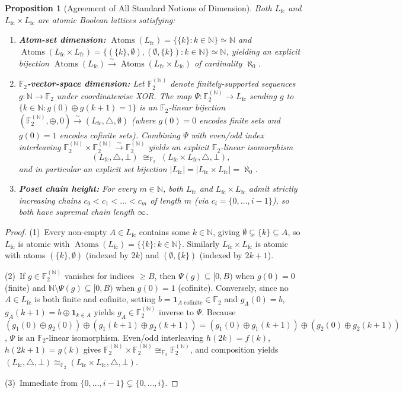 \documentclass[11pt]{article}
\newtheorem{proposition}[theorem]{Proposition}
\theoremstyle{definition}
\theoremstyle{remark}
\newcommand{\Atoms}{\operatorname{Atoms}}
\newcommand{\Ftwo}{\mathbb{F}_2}
\newcommand{\N}{\mathbb{N}}
\newcommand{\Lfc}{L_{\mathrm{fc}}}
\begin{document}
\begin{proposition}[Agreement of All Standard Notions of Dimension]
\label{prop:same-dim}
Both $\Lfc$ and $\Lfc \times \Lfc$ are atomic Boolean lattices satisfying:
\begin{enumerate}
  \item \textbf{Atom-set dimension:} $\Atoms(\Lfc) = \{\{k\} : k \in \N\} \simeq \N$ and $\Atoms(\Lfc \times \Lfc) = \{(\{k\}, \emptyset), (\emptyset, \{k\}) : k \in \N\} \simeq \N$, yielding an explicit bijection $\Atoms(\Lfc) \xrightarrow{\sim} \Atoms(\Lfc \times \Lfc)$ of cardinality $\aleph_0$.
  \item \textbf{$\Ftwo$-vector-space dimension:} Let $\Ftwo^{(\N)}$ denote finitely-supported sequences $g : \N \to \Ftwo$ under coordinatewise XOR. The map $\Psi : \Ftwo^{(\N)} \to \Lfc$ sending $g$ to $\{k \in \N : g(0) \oplus g(k+1) = 1\}$ is an $\Ftwo$-linear bijection $(\Ftwo^{(\N)}, \oplus, 0) \xrightarrow{\sim} (\Lfc, \triangle, \emptyset)$ (where $g(0) = 0$ encodes finite sets and $g(0) = 1$ encodes cofinite sets). Combining $\Psi$ with even/odd index interleaving $\Ftwo^{(\N)} \times \Ftwo^{(\N)} \xrightarrow{\sim} \Ftwo^{(\N)}$ yields an explicit $\Ftwo$-linear isomorphism
  \[
    (\Lfc, \triangle, \bot) \;\cong_{\Ftwo}\; (\Lfc \times \Lfc, \triangle, \bot),
  \]
  and in particular an explicit set bijection $|\Lfc| = |\Lfc \times \Lfc| = \aleph_0$.
  \item \textbf{Poset chain height:} For every $m \in \N$, both $\Lfc$ and $\Lfc \times \Lfc$ admit strictly increasing chains $c_0 < c_1 < \dots < c_m$ of length $m$ (via $c_i = \{0, \dots, i-1\}$), so both have supremal chain length $\infty$.
\end{enumerate}
\end{proposition}
\begin{proof}
(1)~Every non-empty $A \in \Lfc$ contains some $k \in \N$, giving $\emptyset \subsetneq \{k\} \subseteq A$, so $\Lfc$ is atomic with $\Atoms(\Lfc) = \{\{k\} : k \in \N\}$. Similarly $\Lfc \times \Lfc$ is atomic with atoms $(\{k\}, \emptyset)$ (indexed by $2k$) and $(\emptyset, \{k\})$ (indexed by $2k+1$).

(2)~If $g \in \Ftwo^{(\N)}$ vanishes for indices $\ge B$, then $\Psi(g) \subseteq [0, B)$ when $g(0) = 0$ (finite) and $\N \setminus \Psi(g) \subseteq [0, B)$ when $g(0) = 1$ (cofinite). Conversely, since no $A \in \Lfc$ is both finite and cofinite, setting $b = \mathbf{1}_{\text{$A$ cofinite}} \in \Ftwo$ and $g_A(0) = b$, $g_A(k+1) = b \oplus \mathbf{1}_{k \in A}$ yields $g_A \in \Ftwo^{(\N)}$ inverse to $\Psi$. Because $(g_1(0) \oplus g_2(0)) \oplus (g_1(k+1) \oplus g_2(k+1)) = (g_1(0) \oplus g_1(k+1)) \oplus (g_2(0) \oplus g_2(k+1))$, $\Psi$ is an $\Ftwo$-linear isomorphism. Even/odd interleaving $h(2k) = f(k)$, $h(2k+1) = g(k)$ gives $\Ftwo^{(\N)} \times \Ftwo^{(\N)} \cong_{\Ftwo} \Ftwo^{(\N)}$, and composition yields $(\Lfc, \triangle, \bot) \cong_{\Ftwo} (\Lfc \times \Lfc, \triangle, \bot)$.

(3)~Immediate from $\{0,\dots,i-1\} \subsetneq \{0,\dots,i\}$.
\end{proof}
\end{document}
